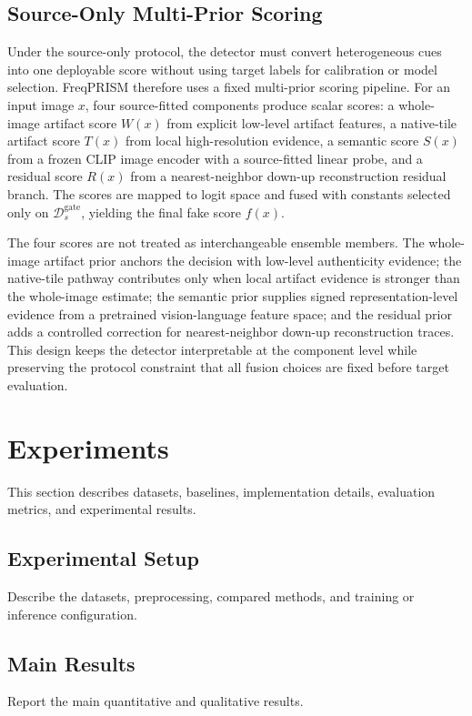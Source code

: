 \documentclass[lettersize,journal]{IEEEtran}
\begin{document}
\subsection{Source-Only Multi-Prior Scoring}
\label{sec:method_scoring}

Under the source-only protocol, the detector must convert heterogeneous cues into one deployable score without using target labels for calibration or model selection. FreqPRISM therefore uses a fixed multi-prior scoring pipeline. For an input image $x$, four source-fitted components produce scalar scores: a whole-image artifact score $W(x)$ from explicit low-level artifact features, a native-tile artifact score $T(x)$ from local high-resolution evidence, a semantic score $S(x)$ from a frozen CLIP image encoder with a source-fitted linear probe, and a residual score $R(x)$ from a nearest-neighbor down-up reconstruction residual branch. The scores are mapped to logit space and fused with constants selected only on $\mathcal{D}_{s}^{\mathrm{gate}}$, yielding the final fake score $f(x)$.

The four scores are not treated as interchangeable ensemble members. The whole-image artifact prior anchors the decision with low-level authenticity evidence; the native-tile pathway contributes only when local artifact evidence is stronger than the whole-image estimate; the semantic prior supplies signed representation-level evidence from a pretrained vision-language feature space; and the residual prior adds a controlled correction for nearest-neighbor down-up reconstruction traces. This design keeps the detector interpretable at the component level while preserving the protocol constraint that all fusion choices are fixed before target evaluation.

\section{Experiments}
\label{sec:experiments}
This section describes datasets, baselines, implementation details, evaluation metrics, and experimental results.

\subsection{Experimental Setup}
\label{sec:experimental_setup}
Describe the datasets, preprocessing, compared methods, and training or inference configuration.

\subsection{Main Results}
\label{sec:main_results}
Report the main quantitative and qualitative results.
\end{document}
